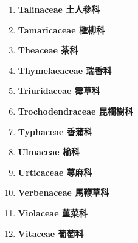\begin{enumerate}
        
      \item[] \begin{small}\textbf{Talinaceae 土人參科} \end{small}
        
      \item[] \begin{small}\textbf{Tamaricaceae 檉柳科} \end{small}
        
      \item[] \begin{small}\textbf{Theaceae 茶科} \end{small}
        
      \item[] \begin{small}\textbf{Thymelaeaceae 瑞香科} \end{small}
        
      \item[] \begin{small}\textbf{Triuridaceae 霉草科} \end{small}
        
      \item[] \begin{small}\textbf{Trochodendraceae 昆欄樹科} \end{small}
        
      \item[] \begin{small}\textbf{Typhaceae 香蒲科} \end{small}
        
      \item[] \begin{small}\textbf{Ulmaceae 榆科} \end{small}
        
      \item[] \begin{small}\textbf{Urticaceae 蕁麻科} \end{small}
        
      \item[] \begin{small}\textbf{Verbenaceae 馬鞭草科} \end{small}
        
      \item[] \begin{small}\textbf{Violaceae 菫菜科} \end{small}
        
      \item[] \begin{small}\textbf{Vitaceae 葡萄科} \end{small}

\end{enumerate}
